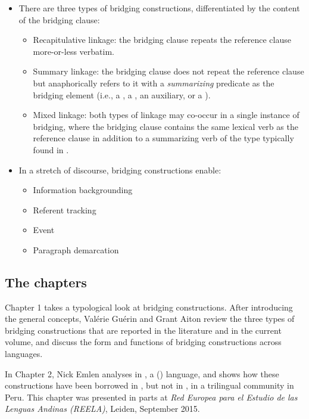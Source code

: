 \begin{refsection}
 \begin{itemize}  
\item There are three types of bridging constructions, differentiated by the content of the bridging clause: 
\begin{itemize}
\item Recapitulative linkage: the bridging clause repeats the reference clause more-or-less verbatim. 
\item  Summary linkage: the bridging clause does not repeat the reference clause but anaphorically refers to it with a \textit{summarizing} predicate as the bridging element (i.e., a , a , an auxiliary, or a ). 
\item Mixed linkage: both types of linkage may co-occur in a single instance of bridging, where the bridging clause contains the same lexical verb as the reference clause in addition to a summarizing verb of the type typically found in .
\end{itemize}
\end{itemize}

 \begin{itemize} 
\item  In a stretch of discourse, bridging constructions enable:
\begin{itemize}
\item  Information backgrounding
\item  Referent tracking
\item  Event  
\item  Paragraph demarcation
\end{itemize}
\end{itemize}


\subsection*{The chapters}

Chapter 1 takes a typological look at bridging constructions. After introducing the general concepts, Valérie Guérin and Grant Aiton review the three types of bridging constructions that are reported in the literature and in the current volume, and discuss the form and functions of bridging constructions across languages. 

In Chapter 2, Nick Emlen analyses  in , a  () language, and shows how these constructions have been borrowed in , but not in , in a trilingual community in Peru. This chapter was presented in parts at \textit{Red Europea para el Estudio de las Lenguas Andinas (REELA)}, Leiden, September 2015. 


\end{refsection}
